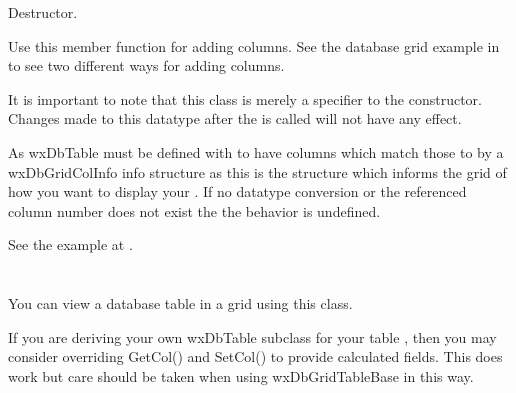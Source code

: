 \label{wxdbgridcolinfodtor}


Destructor.

\label{wxdbgridcolinfoaddcolinfo}


Use this member function for adding columns. See the database
grid example in  to
see two different ways for adding columns.

It is important to note that this class is merely a specifier to the  
constructor. Changes made to this datatype after the  is called will
not have any effect.



As wxDbTable must be defined with to have columns which match those  to by a wxDbGridColInfo
info structure as this is the structure which informs the grid of how you want to display your 
. If no datatype conversion or the referenced column number does not exist the
the behavior is undefined.

See the example at .

\section{}\label{wxdbgridtablebase}

You can view a database table in a grid using this class.

If you are deriving your own wxDbTable subclass for your table , then you may consider
overriding GetCol() and SetCol() to provide calculated fields. This does work but care should
be taken when using wxDbGridTableBase in this way.

